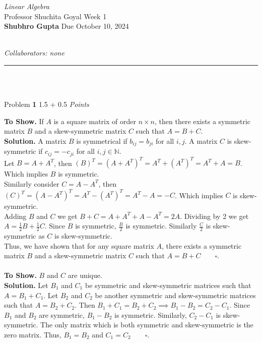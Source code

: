 \documentclass[11pt]{article}
\newcommand{\problem
}[2]{
\begin{mdframed}
    Problem \textbf{#1} \hfill #2
\end{mdframed}
}
\newcommand{\heading}[5]{
\begin{large}
\noindent\emph{#1}\smallskip ~\\
Professor #3 \hfill Week #2 \smallskip ~\\
\textbf{Shubhro Gupta} \hfill Due #4 ~\\
\end{large} \medskip ~\\
{\emph{Collaborators: #5}}~\\
\hrule
\vspace{50pt}
~\\
}
\begin{document}
\heading{Linear Algebra}{1}{Shuchita Goyal}{October 10, 2024}{none}
\\
\problem{1}{1.5 + 0.5 \emph{Points}}
\textbf{To Show.} If $A$ is a square matrix of order $n \times n$, then there exists a symmetric matrix $B$ and a skew-symmetric matrix $C$ such that $A = B + C$.\\
\textbf{Solution. } A matrix $B$ is symmetrical if $b_{ij} = b_{ji}$ for all $i, j$. A matrix $C$ is skew-symmetric if $c_{ij} = -c_{ji}$ for all $i, j \in \mathbb{N}$.\\
Let $B = A + A^T$, then $(B)^T = (A + A^T)^T = A^T + (A^T)^T = A^T + A = B$. Which implies $B$ is symmetric.\\ Similarly consider $C = A - A^T$, then $(C)^T = (A - A^T)^T = A^T - (A^T)^T = A^T - A = -C$. Which implies $C$ is skew-symmetric.\\
Adding $B$ and $C$ we get $B + C = A + A^T + A - A^T = 2A$. Dividing by 2 we get $A =  \frac{1}{2} B  + \frac{1}{2} C$. Since $B$ is symmetric, $\frac{B}{2}$ is symmetric. Similarly $\frac{C}{2}$ is skew-symmetric as $C$ is skew-symmetric.\\
Thus, we have shown that for any square matrix $A$, there exists a symmetric matrix $B$ and a skew-symmetric matrix $C$ such that $A = B + C \qquad \square.$ \\
\\
\textbf{To Show. } $B$ and $C$ are unique.\\
\textbf{Solution. } Let $B_1$ and $C_1$ be symmetric and skew-symmetric matrices such that $A = B_1 + C_1$. Let $B_2$ and $C_2$ be another symmetric and skew-symmetric matrices such that $A = B_2 + C_2$.
Then $B_1 + C_1 = B_2 + C_2 \implies B_1 - B_2 = C_2 - C_1$. Since $B_1$ and $B_2$ are symmetric, $B_1 - B_2$ is symmetric. Similarly, $C_2 - C_1$ is skew-symmetric. The only matrix which is both symmetric and skew-symmetric is the zero matrix. Thus, $B_1 = B_2$ and $C_1 = C_2 \qquad \square$.
\\
\end{document}
